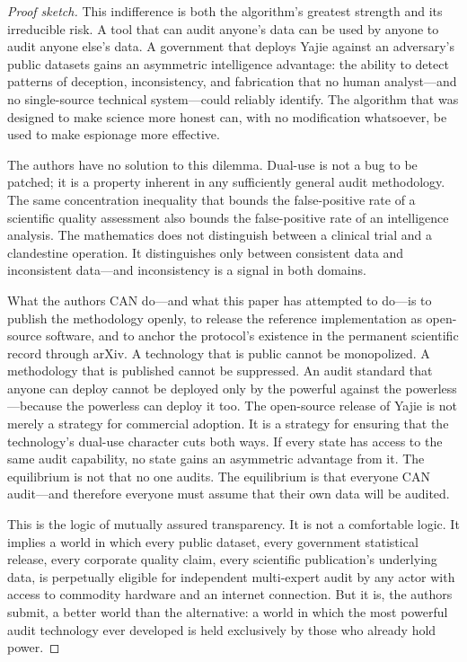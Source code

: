 \documentclass[12pt,a4paper]{ctexart}
\theoremstyle{definition}
\theoremstyle{remark}
\begin{document}
\begin{proof}[Proof sketch]
This indifference is both the algorithm's greatest strength and its irreducible risk. A tool that can audit anyone's data can be used by anyone to audit anyone else's data. A government that deploys Yajie against an adversary's public datasets gains an asymmetric intelligence advantage: the ability to detect patterns of deception, inconsistency, and fabrication that no human analyst—and no single-source technical system—could reliably identify. The algorithm that was designed to make science more honest can, with no modification whatsoever, be used to make espionage more effective.

The authors have no solution to this dilemma. Dual-use is not a bug to be patched; it is a property inherent in any sufficiently general audit methodology. The same concentration inequality that bounds the false-positive rate of a scientific quality assessment also bounds the false-positive rate of an intelligence analysis. The mathematics does not distinguish between a clinical trial and a clandestine operation. It distinguishes only between consistent data and inconsistent data—and inconsistency is a signal in both domains.

What the authors CAN do—and what this paper has attempted to do—is to publish the methodology openly, to release the reference implementation as open-source software, and to anchor the protocol's existence in the permanent scientific record through arXiv. A technology that is public cannot be monopolized. A methodology that is published cannot be suppressed. An audit standard that anyone can deploy cannot be deployed only by the powerful against the powerless—because the powerless can deploy it too. The open-source release of Yajie is not merely a strategy for commercial adoption. It is a strategy for ensuring that the technology's dual-use character cuts both ways. If every state has access to the same audit capability, no state gains an asymmetric advantage from it. The equilibrium is not that no one audits. The equilibrium is that everyone CAN audit—and therefore everyone must assume that their own data will be audited.

This is the logic of mutually assured transparency. It is not a comfortable logic. It implies a world in which every public dataset, every government statistical release, every corporate quality claim, every scientific publication's underlying data, is perpetually eligible for independent multi-expert audit by any actor with access to commodity hardware and an internet connection. But it is, the authors submit, a better world than the alternative: a world in which the most powerful audit technology ever developed is held exclusively by those who already hold power.


\end{proof}
\end{document}
